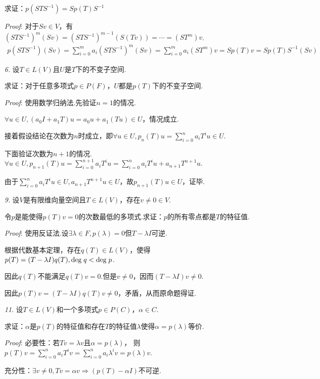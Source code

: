 求证：$p(STS^{-1})=Sp(T)S^{-1}$

\textit{Proof}:
对于$Sv \in V$，有$(STS^{-1})^m (Sv)=(STS^{-1})^{m-1}(S(Tv))=\cdots=(ST^m)v$.
    \begin{align*}
        p(STS^{-1})(Sv)=\sum_{i=0}^m a_i(STS^{-1})^m (Sv) 
        =\sum_{i=0}^m a_i(ST^m)v=Sp(T)v=Sp(T)S^{-1}(Sv)
    \end{align*}

\newpage

\textit{6.}
设$T \in L(V)$且$U$是$T$下的不变子空间.

求证：对于任意多项式$p \in P(F)$，$U$都是$p(T)$下的不变子空间.

\textit{Proof}:
使用数学归纳法.先验证$n=1$的情况.

$\forall u \in U,(a_0I+a_1T)u=a_0u+a_1(Tu) \in U$，情况成立.

接着假设结论在次数为$n$时成立，即$\forall u \in U,p_n(T)u=\sum_{i=0}^n a_iT^iu \in U$.

下面验证次数为$n+1$的情况.
$\forall u \in U,p_{n+1}(T)u=\sum_{i=0}^{n+1} a_iT^iu=\sum_{i=0}^n a_iT^iu+a_{n+1}T^{n+1}u$.

由于$\sum_{i=0}^n a_iT^iu \in U,a_{n+1}T^{n+1}u \in U$，故$p_{n+1}(T)u \in U$，证毕.

\hspace*{\fill}

\textit{9.}
设$V$是有限维向量空间且$T \in L(V)$，存在$v \ne 0 \in V$.

令$p$是能使得$p(T)v=0$的次数最低的多项式.求证：$p$的所有零点都是$T$的特征值.

\textit{Proof}:
使用反证法.设$\exists \lambda \in F,p(\lambda)=0$但$T-\lambda I$可逆.

根据代数基本定理，存在$q(T) \in L(V)$，使得$p(T)=(T-\lambda I)q(T),\mathrm{deg \;} q<\mathrm{deg \;} p$.

因此$q(T)$不能满足$q(T)v=0$.但是$v \ne 0$，因而$(T-\lambda I)v \ne 0$.

因此$p(T)v=(T-\lambda I)q(T)v \ne 0$，矛盾，从而原命题得证.

\hspace*{\fill}

\textit{11.}
设$T \in L(V)$和一个多项式$p \in P(C)$，$\alpha \in C$.

求证：$\alpha$是$p(T)$的特征值和存在$T$的特征值$\lambda$使得$\alpha=p(\lambda)$等价.

\textit{Proof}:
必要性：若$Tv=\lambda v$且$\alpha=p(\lambda)$，
则$p(T)v=\sum_{i=0}^n a_iT^iv=\sum_{i=0}^n a_i\lambda^iv=p(\lambda)v$.

充分性：$\exists v \ne 0,Tv=\alpha v \Rightarrow (p(T)-\alpha I)$不可逆.

